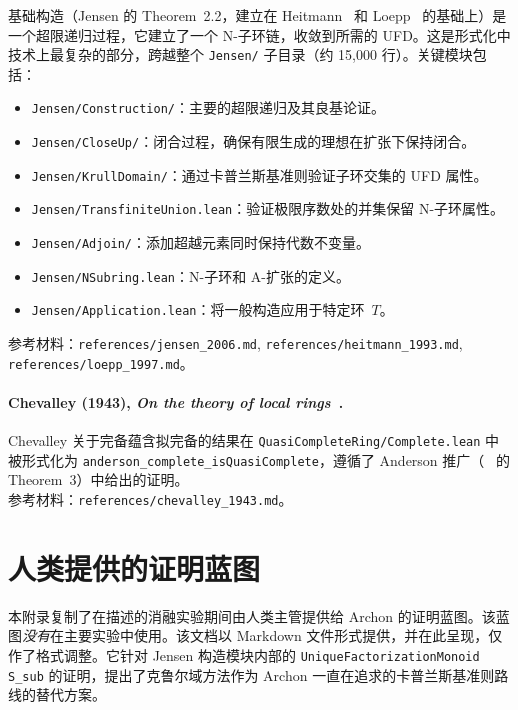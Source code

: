 基础构造（Jensen 的 Theorem~2.2，建立在 Heitmann~\cite{heitmann1993characterization} 和 Loepp~\cite{loepp1997constructing} 的基础上）是一个超限递归过程，它建立了一个 N-子环链，收敛到所需的 UFD。这是形式化中技术上最复杂的部分，跨越整个 \texttt{Jensen/} 子目录（约 15,000 行）。关键模块包括：
\begin{itemize}
\item \texttt{Jensen/Construction/}：主要的超限递归及其良基论证。
\item \texttt{Jensen/CloseUp/}：闭合过程，确保有限生成的理想在扩张下保持闭合。
\item \texttt{Jensen/KrullDomain/}：通过卡普兰斯基准则验证子环交集的 UFD 属性。
\item \texttt{Jensen/TransfiniteUnion.lean}：验证极限序数处的并集保留 N-子环属性。
\item \texttt{Jensen/Adjoin/}：添加超越元素同时保持代数不变量。
\item \texttt{Jensen/NSubring.lean}：N-子环和 A-扩张的定义。
\item \texttt{Jensen/Application.lean}：将一般构造应用于特定环~$T$。
\end{itemize}
参考材料：\texttt{references/jensen\_2006.md}, \texttt{references/heitmann\_1993.md}, \texttt{references/loepp\_1997.md}。

\paragraph{Chevalley (1943), \emph{On the theory of local rings}~\cite{chevalley1943theory}.}

Chevalley 关于完备蕴含拟完备的结果在 \texttt{QuasiCompleteRing/Complete.lean} 中被形式化为 \texttt{anderson\_complete\_isQuasiComplete}，遵循了 Anderson 推广（~\cite{anderson2014quasi} 的 Theorem~3）中给出的证明。\\
参考材料：\texttt{references/chevalley\_1943.md}。

\section{人类提供的证明蓝图}\label{appendix:human-blueprint}

本附录复制了在描述的消融实验期间由人类主管提供给 Archon 的证明蓝图。该蓝图\emph{没有}在主要实验中使用。该文档以 Markdown 文件形式提供，并在此呈现，仅作了格式调整。它针对 Jensen 构造模块内部的 \texttt{UniqueFactorizationMonoid S\_sub} 的证明，提出了克鲁尔域方法作为 Archon 一直在追求的卡普兰斯基准则路线的替代方案。


